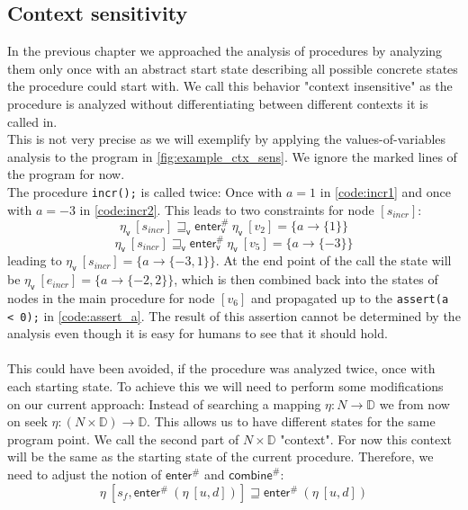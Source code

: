     \subsection{Context sensitivity}
    In the previous chapter we approached the analysis of procedures by analyzing them only once with an abstract start state describing all possible concrete states the procedure could start with. We call this behavior "context insensitive" as the procedure is analyzed without differentiating between different contexts it is called in.\\
    This is not very precise as we will exemplify by applying the values-of-variables analysis to the program in \autoref{fig:example_ctx_sens}. We ignore the marked lines of the program for now.\\
    The procedure \texttt{incr();} is called twice: Once with $a = 1$ in \autoref{code:incr1} and once with $a = -3$ in \autoref{code:incr2}. This leads to two constraints for node $[s_{incr}]$: 
      \[\eta_\textsf{v}\ [s_{incr}] \sqsupseteq_\textsf{v} \textsf{enter}^{\#}_\textsf{v}\ \eta_\textsf{v}\ [v_2] = \{a \rightarrow \{1\} \} \]
      \[\eta_\textsf{v}\ [s_{incr}] \sqsupseteq_\textsf{v} \textsf{enter}^{\#}_\textsf{v}\ \eta_\textsf{v}\ [v_5] = \{a \rightarrow \{-3\} \} \]
    leading to $\eta_\textsf{v}\ [s_{incr}] = \{a \rightarrow \{-3, 1\}\}$. At the end point of the call the state will be $\eta_\textsf{v}\ [e_{incr}] = \{a \rightarrow \{-2, 2\}\}$, which is then combined back into the states of nodes in the main procedure for node $[v_6]$ and propagated up to the \texttt{assert(a < 0);} in \autoref{code:assert_a}. The result of this assertion cannot be determined by the analysis even though it is easy for humans to see that it should hold.\\
    \\
    This could have been avoided, if the procedure was analyzed twice, once with each starting state. To achieve this we will need to perform some modifications on our current approach: Instead of searching a mapping $\eta: N \rightarrow \mathbb{D}$ we from now on seek $\eta: (N \times \mathbb{D}) \rightarrow \mathbb{D}$. This allows us to have different states for the same program point. We call the second part of $N \times \mathbb{D}$ "context". For now this context will be the same as the starting state of the current procedure. Therefore, we need to adjust the notion of $\textsf{enter}^{\#}$ and $\textsf{combine}^{\#}$:
    \[\eta\ [s_f, \textsf{enter}^{\#}\ (\eta\ [u, d])] \sqsupseteq \textsf{enter}^{\#}\ (\eta\ [u, d]) \]
